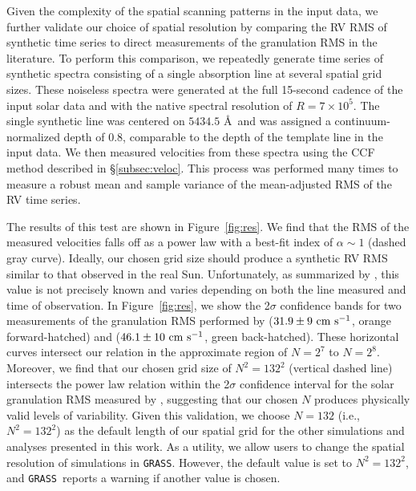 \documentclass[twocolumn]{aastex63}
\newcommand{\cms}{\ {\rm cm\ s}^{-1}}
\newcommand{\grass}{\texttt{GRASS}}
\newcommand{\revise}[1]{#1}
\begin{document}
\revise{Given the complexity of the spatial scanning patterns in the input data, we further validate our choice of spatial resolution by comparing the RV RMS of synthetic time series to direct measurements of the granulation RMS in the literature.} \revise{To perform this comparison,} we repeatedly generate time series of synthetic spectra consisting of a single absorption line at several spatial grid sizes. These noiseless spectra were generated at the full 15-second cadence of the input solar data and with the native spectral resolution of $R=7 \times 10^5$. The single synthetic line was centered on $5434.5$ \AA\ and was assigned a continuum-normalized depth of 0.8, comparable to the depth of the template line in the input data. We then measured velocities from these spectra using the CCF method described in \S\ref{subsec:veloc}. This process was performed many times to measure a robust mean and sample variance of the mean-adjusted RMS of the RV time series. \par

The results of this test are shown in Figure~\ref{fig:res}. We find that the RMS of the measured velocities falls off as a power law with a best-fit index of \revise{$\alpha \sim 1$ (dashed gray curve)}. Ideally, our \revise{chosen grid size should produce a synthetic RV RMS} similar to that observed in the real Sun. Unfortunately, as summarized by \citet{Cegla2019a}, this value is not precisely known and varies depending on both the line measured and time of observation. In Figure~\ref{fig:res}, we show the 2$\sigma$ confidence bands for \revise{two measurements of} the granulation RMS \revise{performed} by \citealt{Elsworth1994} ($31.9 \pm 9 \cms$, \revise{orange forward-hatched}) and \citealt{Palle1999} ($46.1 \pm 10 \cms$, green \revise{back-hatched}). These horizontal curves intersect our relation in the approximate region of $N = 2^7$ to $N=2^8$. \revise{Moreover, we find that our chosen grid size of $N^2 = 132^2$ (vertical dashed line) intersects the power law relation within the 2$\sigma$ confidence interval for the solar granulation RMS measured by \citet{Palle1999}, suggesting that our chosen $N$ produces physically valid levels of variability.} Given this \revise{validation}, we choose $N = 132$ (i.e., $N^2 = 132^2$) as the default \revise{length of our} spatial grid for the other simulations and analyses presented in this work. \revise{As a utility, we allow users to change the spatial resolution of simulations in \grass. However, the default value is set to $N^2 = 132^2$, and \grass\ reports a warning if another value is chosen.} \par
\end{document}
